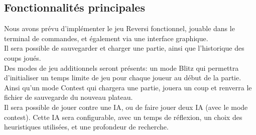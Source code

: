 \documentclass[a4paper,12pt]{article}
\begin{document}
\subsection{Fonctionnalités principales}
Nous avons prévu d'implémenter le jeu Reversi fonctionnel, jouable dans le
terminal de commandes, et également via une interface graphique.\\ Il sera
possible de sauvegarder et charger une partie, ainsi que l'historique des coups
joués.\\ Des modes de jeu additionnels seront présents: un mode Blitz qui
permettra d'initialiser un temps limite de jeu pour chaque joueur au début de
la partie. Ainsi qu'un mode Contest qui chargera une partie, jouera un coup et
renverra le fichier de sauvegarde du nouveau plateau.\\ Il sera possible de
jouer contre une IA, ou de faire jouer deux IA (avec le mode contest). Cette IA
sera configurable, avec un temps de réflexion, un choix des heuristiques
utilisées, et une profondeur de recherche.\\
\end{document}
